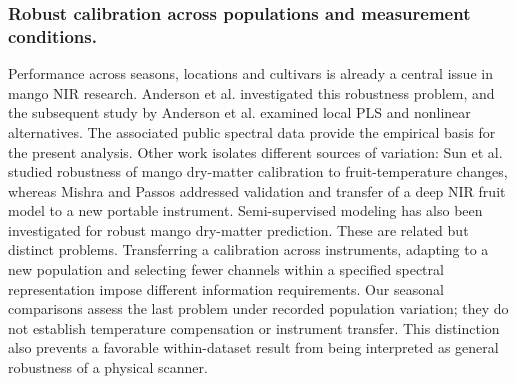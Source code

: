 \documentclass[Review,sagev,times]{sagej}
\begin{document}
\subsubsection{Robust calibration across populations and measurement conditions.}
Performance across seasons, locations and cultivars is already a central issue in mango NIR research. Anderson et al.\citep{anderson2020} investigated this robustness problem, and the subsequent study by Anderson et al.\citep{anderson2021local} examined local PLS and nonlinear alternatives. The associated public spectral data provide the empirical basis for the present analysis.\citep{andersondata2024} Other work isolates different sources of variation: Sun et al.\citep{sun2020temperature} studied robustness of mango dry-matter calibration to fruit-temperature changes, whereas Mishra and Passos\citep{mishra2021transfer} addressed validation and transfer of a deep NIR fruit model to a new portable instrument. Semi-supervised modeling has also been investigated for robust mango dry-matter prediction.\citep{mishra2023} These are related but distinct problems. Transferring a calibration across instruments, adapting to a new population and selecting fewer channels within a specified spectral representation impose different information requirements. Our seasonal comparisons assess the last problem under recorded population variation; they do not establish temperature compensation or instrument transfer. This distinction also prevents a favorable within-dataset result from being interpreted as general robustness of a physical scanner.
\end{document}

